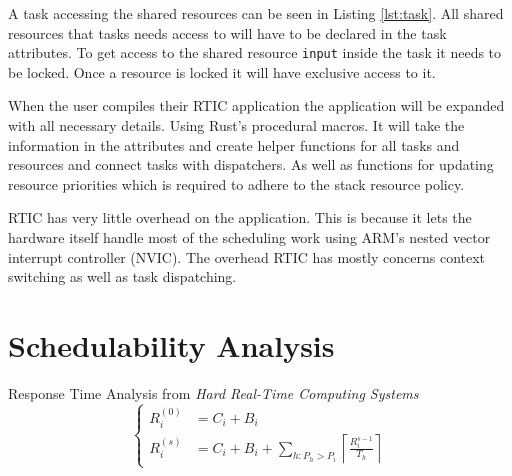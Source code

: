A task accessing the shared resources can be seen in Listing \ref{lst:task}.
All shared resources that tasks needs access to will have to be declared in the
task attributes. To get access to the shared resource \texttt{input} inside the
task it needs to be locked. Once a resource is locked it will have exclusive
access to it.


When the user compiles their RTIC application the application will be expanded
with all necessary details. Using Rust's procedural macros. It will take the
information in the attributes and create helper functions for all tasks and
resources and connect tasks with dispatchers. As well as functions for updating
resource priorities which is required to adhere to the stack resource policy.

RTIC has very little overhead on the application. This is because it lets the
hardware itself handle most of the scheduling work using ARM's nested vector
interrupt controller (NVIC).  The overhead RTIC has mostly concerns context switching
as well as task dispatching.

\section{Schedulability Analysis}
Response Time Analysis from \textit{Hard Real-Time Computing
Systems}\cite{hardrealtimecomputingsystems}
\begin{equation}
    \begin{cases}
        R_{i}^{(0)} &= C_i + B_i \\
        R_{i}^{(s)} &= C_i + B_i + \sum\limits_{h: P_h > P_i} \left\lceil \frac{R_{i}^{s-1}}{T_h} \right\rceil
    \end{cases}
\end{equation}


